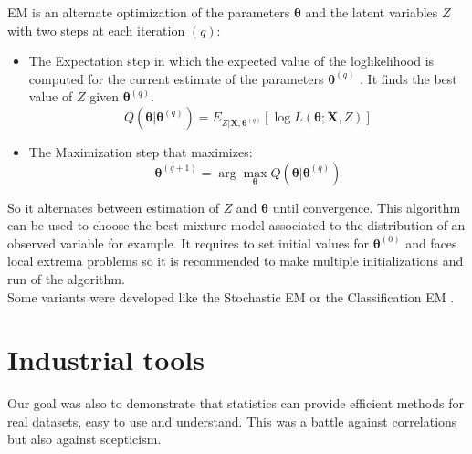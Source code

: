 \documentclass[12pt,a4paper]{report}
\begin{document}
EM is an alternate optimization of the parameters $\boldsymbol{\theta}$ and the latent variables $Z$ with two steps at each iteration $(q)$:
\begin{itemize}
	\item The Expectation step in which the expected value of the loglikelihood is computed for the current estimate of the parameters $\boldsymbol{\theta}^{(q)}$ . It finds the best value of $Z$ given $\boldsymbol{\theta}^{(q)}$.
	\begin{equation}
		Q(\boldsymbol{\theta}|\boldsymbol{\theta}^{(q)})=E_{Z|\boldsymbol{X},\boldsymbol{\theta}^{(q)}} [\log L(\boldsymbol{\theta};\boldsymbol{X},Z)]
	\end{equation}
	\item The Maximization step that maximizes:
	\begin{equation}
		\boldsymbol{\theta}^{(q+1)}=\arg \max_{\boldsymbol{\theta}} Q(\boldsymbol{\theta}|\boldsymbol{\theta}^{(q)})
	\end{equation}
\end{itemize}
	So it alternates between estimation of $Z$ and $\boldsymbol{\theta}$ until convergence. This algorithm can be used to choose the best mixture model associated to the distribution of an observed variable for example.		
	It requires to set initial values for $\boldsymbol{\theta}^{(0)}$ and faces local extrema problems so it is recommended to make multiple initializations and run of the algorithm.\\
			
			Some variants were developed like the Stochastic EM \cite{diebolt1996stochastic,celeux1986algorithme} or the Classification EM \cite{celeux1992classification}.
			
			
		\section{Industrial tools}
			Our goal was also to demonstrate that statistics can provide efficient methods for real datasets, easy to use and understand.	This was a battle against correlations but also against scepticism. \\
			
\end{document}
